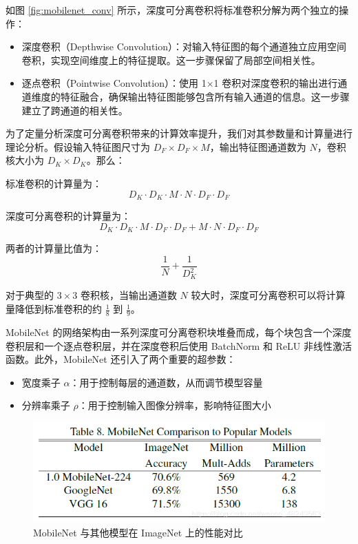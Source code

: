 \documentclass{article}
\begin{document}
如图 \ref{fig:mobilenet_conv} 所示，深度可分离卷积将标准卷积分解为两个独立的操作：
\begin{itemize}
    \item 深度卷积（Depthwise Convolution）：对输入特征图的每个通道独立应用空间卷积，实现空间维度上的特征提取。这一步骤保留了局部空间相关性。
    \item 逐点卷积（Pointwise Convolution）：使用 1$\times$1 卷积对深度卷积的输出进行通道维度的特征融合，确保输出特征图能够包含所有输入通道的信息。这一步骤建立了跨通道的相关性。
\end{itemize}

为了定量分析深度可分离卷积带来的计算效率提升，我们对其参数量和计算量进行理论分析。假设输入特征图尺寸为 $D_F \times D_F \times M$，输出特征图通道数为 $N$，卷积核大小为 $D_K \times D_K$。那么：

标准卷积的计算量为：
\begin{equation}
    D_K \cdot D_K \cdot M \cdot N \cdot D_F \cdot D_F
\end{equation}

深度可分离卷积的计算量为：
\begin{equation}
    D_K \cdot D_K \cdot M \cdot D_F \cdot D_F + M \cdot N \cdot D_F \cdot D_F
\end{equation}

两者的计算量比值为：
\begin{equation}
    \frac{1}{N} + \frac{1}{D_K^2}
\end{equation}

对于典型的 $3\times3$ 卷积核，当输出通道数 $N$ 较大时，深度可分离卷积可以将计算量降低到标准卷积的约 $\frac{1}{8}$ 到 $\frac{1}{9}$。

MobileNet 的网络架构由一系列深度可分离卷积块堆叠而成，每个块包含一个深度卷积层和一个逐点卷积层，并在深度卷积后使用 BatchNorm 和 ReLU 非线性激活函数。此外，MobileNet 还引入了两个重要的超参数：
\begin{itemize}
    \item 宽度乘子 $\alpha$：用于控制每层的通道数，从而调节模型容量
    \item 分辨率乘子 $\rho$：用于控制输入图像分辨率，影响特征图大小
\end{itemize}

\begin{figure}[htbp]
    \centering
    \includegraphics[width=0.8\linewidth]{imgs/mobilenet_comp.png}
    \caption{MobileNet 与其他模型在 ImageNet 上的性能对比}
    \label{fig:mobilenet_comp}
\end{figure}
\end{document}
